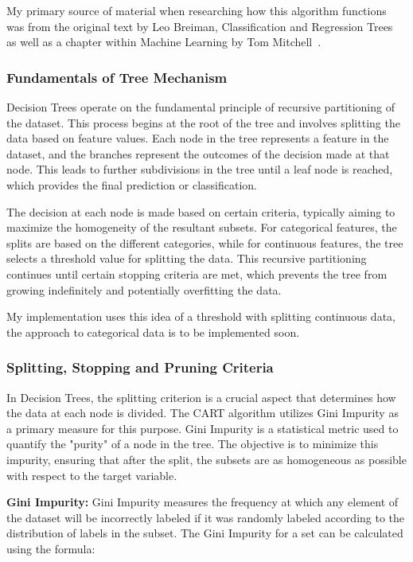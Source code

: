 \documentclass[letterpaper,10pt]{article}
\begin{document}
My primary source of material when researching how this algorithm functions was from the original text by Leo Breiman, Classification and Regression Trees~\cite{CARTBreiman} as well as a chapter within Machine Learning by Tom Mitchell~\cite[pp 52-80]{mitchell1997machine}.



\subsubsection{Fundamentals of Tree Mechanism}
Decision Trees operate on the fundamental principle of recursive partitioning of the dataset. This process begins at the root of the tree and involves splitting the data based on feature values. Each node in the tree represents a feature in the dataset, and the branches represent the outcomes of the decision made at that node. This leads to further subdivisions in the tree until a leaf node is reached, which provides the final prediction or classification.\par

The decision at each node is made based on certain criteria, typically aiming to maximize the homogeneity of the resultant subsets. For categorical features, the splits are based on the different categories, while for continuous features, the tree selects a threshold value for splitting the data. This recursive partitioning continues until certain stopping criteria are met, which prevents the tree from growing indefinitely and potentially overfitting the data.\par

My implementation uses this idea of a threshold with splitting continuous data, the approach to categorical data is to be implemented soon. \par
\subsubsection{Splitting, Stopping and Pruning Criteria}
In Decision Trees, the splitting criterion is a crucial aspect that determines how the data at each node is divided. The CART algorithm utilizes Gini Impurity as a primary measure for this purpose. Gini Impurity is a statistical metric used to quantify the "purity" of a node in the tree. The objective is to minimize this impurity, ensuring that after the split, the subsets are as homogeneous as possible with respect to the target variable. \par

\textbf{Gini Impurity:}
Gini Impurity measures the frequency at which any element of the dataset will be incorrectly labeled if it was randomly labeled according to the distribution of labels in the subset. The Gini Impurity for a set can be calculated using the formula:
\end{document}
